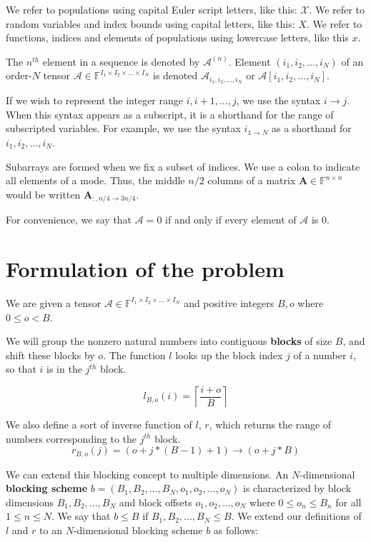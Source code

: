 \documentclass[12pt]{article}
\newcommand{\Mat}[1] {\mathbf{#1}}
\newcommand{\Ten}[1] {\mathbf{\mathcal{#1}}}
\newcommand{\Pop}[1] {\mathcal{#1}}
\newcommand{\F} {\mathbb{F}}
\begin{document}
    We refer to populations using capital Euler script letters, like this: $\Pop{X}$. We refer to random variables and index bounds using capital letters, like this: $X$. We refer to functions, indices and elements of populations using lowercase letters, like this $x$.

    The $n^{th}$ element in a sequence is denoted by $\Ten{A}^{(n)}$.
    Element $(i_1, i_2, ..., i_N)$ of an order-$N$ tensor $\Ten{A} \in \F^{I_1 \times I_2 \times ... \times I_N}$ is denoted $\Ten{A}_{i_1, i_2, ..., i_N}$ or $ \Ten{A}[i_1, i_2, ..., i_N]$.

    If we wish to represent the integer range $i, i + 1, ..., j$, we use the syntax $i \to j$. When this syntax appears as a subscript, it is a shorthand for the range of subscripted variables. For example, we use the syntax $i_{1 \to N}$ as a shorthand for $i_1, i_2, ..., i_N$.

    Subarrays are formed when we fix a subset of indices. We use a colon to indicate all elements of a mode. Thus, the middle $n/2$ columns of a matrix $\Mat{A} \in \F^{n \times n}$ would be written $\Mat{A}_{:, n/4 \to 3n/4}$.

    For convenience, we say that $\Ten{A} = 0$ if and only if every element of $\Ten{A}$ is 0.

  \section{Formulation of the problem}
    We are given a tensor $\Ten{A} \in \F^{I_1 \times I_2 \times ... \times I_N}$ and positive integers $B, o$ where $0 \leq o < B$.

    We will group the nonzero natural numbers into contiguous \textbf{blocks} of size $B$, and shift these blocks by $o$. The function $l$ looks up the block index $j$ of a number $i$, so that $i$ is in the $j^{th}$ block.

    \[
      l_{B, o}(i) = \left\lceil\frac{i + o}{B}\right\rceil
    \]

    We also define a sort of inverse function of $l$, $r$, which returns the range of numbers corresponding to the $j^{th}$ block.
    \[
      r_{B, o}(j) = (o + j * (B - 1) + 1) \to (o + j * B)
    \]

    We can extend this blocking concept to multiple dimensions. An $N$-dimensional \textbf{blocking scheme} $b = (B_1, B_2, ..., B_N, o_1, o_2, ..., o_N)$ is characterized by block dimensions $B_1, B_2, ..., B_N$ and block offsets $o_1, o_2, ..., o_N$ where $0 \leq o_n \leq B_n$ for all $1 \leq n \leq N$. We say that $b \leq B$ if $B_1, B_2, ..., B_N \leq B$. We extend our definitions of $l$ and $r$ to an $N$-dimensional blocking scheme $b$ as follows:
\end{document}
